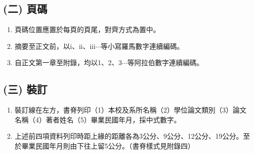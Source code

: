 \subsection{(二) 頁碼}
\begin{enumerate}
    \item 頁碼位置應置於每頁的頁尾，對齊方式為置中。
    \item 摘要至正文前，以i、ii、iii$\cdots$等小寫羅馬數字連續編碼。
    \item 自正文第一章至附錄，均以1、2、3$\cdots$等阿拉伯數字連續編碼。
\end{enumerate}

\subsection{(三) 裝訂}
\begin{enumerate}
    \item 裝訂線在左方，書脊列印（1）本校及系所名稱（2）學位論文類別（3）論文名稱（4）著者姓名（5）畢業民國年月，採中式數字。
    \item 上述前四項資料列印時距上緣的距離各為3公分、9公分、12公分、19公分。至於畢業民國年月則由下往上留5公分。（書脊樣式見附錄四）
\end{enumerate}
